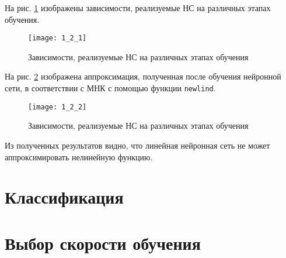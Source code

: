 На рис. \ref{fig:1_2_1} изображены зависимости, реализуемые НС на различных этапах обучения.
\begin{figure}[H]
\begin{center}
	\texttt{[image: 1\_2\_1]}
	\caption{Зависимости, реализуемые НС на различных этапах обучения}
	\label{fig:1_2_1}
\end{center}
\end{figure}

На рис. \ref{fig:1_2_2} изображена аппроксимация, полученная после обучения нейронной сети, в соответствии с МНК с помощью функции \verb+newlind+.
\begin{figure}[H]
\begin{center}
	\texttt{[image: 1\_2\_2]}
	\caption{Зависимости, реализуемые НС на различных этапах обучения}
	\label{fig:1_2_2}
\end{center}
\end{figure}

Из полученных результатов видно, что линейная нейронная сеть не может аппроксимировать нелинейную функцию.

\section{Классификация}


\section{Выбор скорости обучения}


